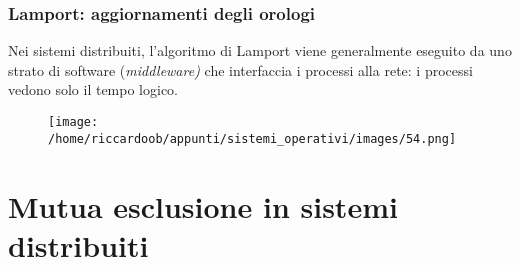 \subsubsection{Lamport: aggiornamenti degli orologi}
Nei sistemi distribuiti, l'algoritmo di Lamport viene generalmente eseguito da uno strato di software (\textit{middleware)} che interfaccia i processi alla rete: i processi vedono solo il tempo logico.

\begin{figure}[H]
    \centering
    \texttt{[image: /home/riccardoob/appunti/sistemi\_operativi/images/54.png]}
\end{figure}

\section{Mutua esclusione in sistemi distribuiti}
























































